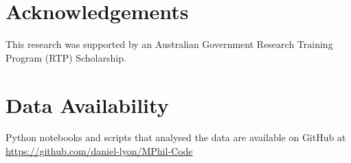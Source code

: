 \section*{Acknowledgements}
This research was supported by an Australian Government Research Training Program (RTP) Scholarship.

\section*{Data Availability}
Python notebooks and scripts that analysed the data are available on GitHub at \url{https://github.com/daniel-lyon/MPhil-Code}



